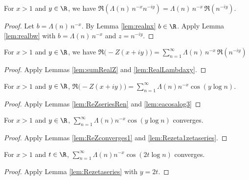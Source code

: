 \begin{lemma}\label{lem:RealLambdaxy}  \leanok
For $x>1$ and $y\in\R$, we have $\Re(\Lambda(n)\,n^{-x} n^{-iy}) = \Lambda(n)\,n^{-x}\,\Re(n^{-iy})$.
\end{lemma}
\begin{proof} \leanok {}
Let $b=\Lambda(n)\,n^{-x}$.
By Lemma \ref{lem:realnx} $b\in\R$.
Apply Lemma \ref{lem:realbw} with $b=\Lambda(n)\,n^{-x}$ and $z=n^{-iy}$.
\end{proof}

\begin{lemma}\label{lem:ReZseriesRen}  \leanok
For $x>1$ and $y\in\R$, we have $\Re\big(-Z(x+iy)\big) = \sum_{n=1}^{\infty} \Lambda(n)\,n^{-x}\,\Re(n^{-iy})$
\end{lemma}
\begin{proof} \leanok {}
Apply Lemmas \ref{lem:sumRealZ} and \ref{lem:RealLambdaxy}.
\end{proof}



\begin{lemma} \label{lem:Rezeta1zetaseries}  \leanok
For $x>1$ and $y\in\R$, $\Re\big(-Z(x+iy)\big) = \sum_{n=1}^{\infty} \Lambda(n) n^{-x}\cos(y\log n)$.
\end{lemma}
\begin{proof} \leanok {}
Apply Lemmas \ref{lem:ReZseriesRen} and \ref{lem:eacosalog3}
\end{proof}

\begin{lemma} \label{lem:Rezetaseries}  \leanok
For $x>1$ and $y\in\R$, $\sum_{n=1}^{\infty} \Lambda(n) n^{-x}\cos(y\log n)$ converges.
\end{lemma}
\begin{proof} \leanok {}
Apply Lemmas \ref{lem:ReZconverges1} and \ref{lem:Rezeta1zetaseries}.
\end{proof}

\begin{lemma} \label{lem:Rezetaseries2t}  \leanok
For $x>1$ and $t\in\R$, $\sum_{n=1}^{\infty} \Lambda(n) n^{-x}\cos(2t\log n)$ converges.
\end{lemma}
\begin{proof} \leanok {}
Apply Lemma \ref{lem:Rezetaseries} with $y=2t$.
\end{proof}

